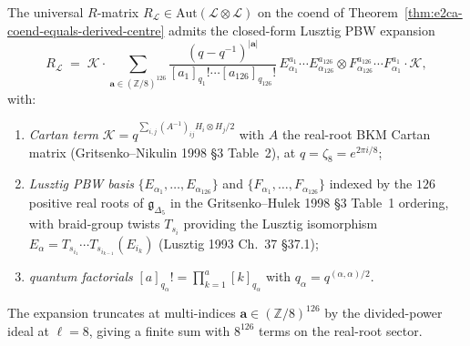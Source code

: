 \begin{theorem}
\label{thm:e2ca-coend-braiding-lusztig-pbw}
The universal $R$-matrix $R_{\mathcal L}\in\mathrm{Aut}(\mathcal L
\otimes\mathcal L)$ on the coend of
Theorem~\ref{thm:e2ca-coend-equals-derived-centre} admits the
closed-form Lusztig PBW expansion
\[
 \boxed{\;
 R_{\mathcal L}
 \;=\;
 \mathcal K\cdot\!\!\sum_{\mathbf a\in(\mathbb Z/8)^{126}}\!\!
 \frac{(q - q^{-1})^{|\mathbf a|}}{[a_1]_{q_1}!\cdots[a_{126}]_{q_{126}}!}
 \,
 E_{\alpha_1}^{a_1}\cdots E_{\alpha_{126}}^{a_{126}}
 \otimes
 F_{\alpha_{126}}^{a_{126}}\cdots F_{\alpha_1}^{a_1}
 \cdot\mathcal K,\;}
\]
with:
\begin{enumerate}[label=\textup{(\roman*)}]
\item \emph{Cartan term} $\mathcal K = q^{\sum_{i,j} (A^{-1})_{ij}
 H_i\otimes H_j / 2}$ with $A$ the real-root BKM Cartan matrix
 (Gritsenko--Nikulin 1998 \S3 Table~2), at
 $q = \zeta_8 = e^{2\pi i/8}$;
\item \emph{Lusztig PBW basis} $\{E_{\alpha_1}, \ldots, E_{\alpha_{126}}\}$
 and $\{F_{\alpha_1}, \ldots, F_{\alpha_{126}}\}$ indexed by the
 $126$ positive real roots of $\mathfrak g_{\Delta_5}$ in the
 Gritsenko--Hulek 1998 \S3 Table~1 ordering, with braid-group
 twists $T_{s_i}$ providing the Lusztig isomorphism
 $E_{\alpha} = T_{s_{i_1}}\cdots T_{s_{i_{k-1}}}(E_{i_k})$
 (Lusztig 1993 Ch.~37 \S37.1);
\item \emph{quantum factorials} $[a]_{q_\alpha}! = \prod_{k=1}^a
 [k]_{q_\alpha}$ with $q_\alpha = q^{(\alpha,\alpha)/2}$.
\end{enumerate}
The expansion truncates at multi-indices $\mathbf a\in(\mathbb Z/8)^{126}$
by the divided-power ideal at $\ell = 8$, giving a finite sum with
$8^{126}$ terms on the real-root sector.
\end{theorem}

